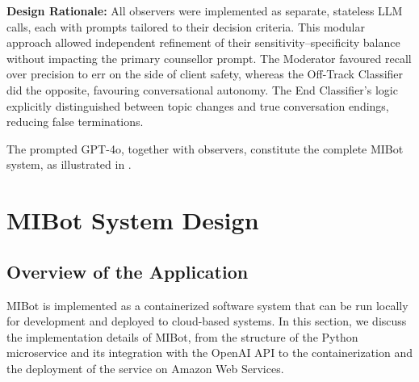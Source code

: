 \textbf{Design Rationale:} All observers were implemented as separate, stateless LLM calls, each with prompts tailored to their decision criteria. This modular approach allowed independent refinement of their sensitivity–specificity balance without impacting the primary counsellor prompt. The Moderator favoured recall over precision to err on the side of client safety, whereas the Off-Track Classifier did the opposite, favouring conversational autonomy. The End Classifier's logic explicitly distinguished between topic changes and true conversation endings, reducing false terminations.


The prompted GPT-4o, together with observers, constitute the complete MIBot system, as illustrated in .


\section{MIBot System Design}
\label{sec:deployment}


\subsection{Overview of the Application}


MIBot is implemented as a containerized software system that can be run locally for development and deployed to cloud-based systems. In this section, we discuss the implementation details of MIBot, from the structure of the Python microservice and its integration with the OpenAI API to the containerization and the deployment of the service on Amazon Web Services.

